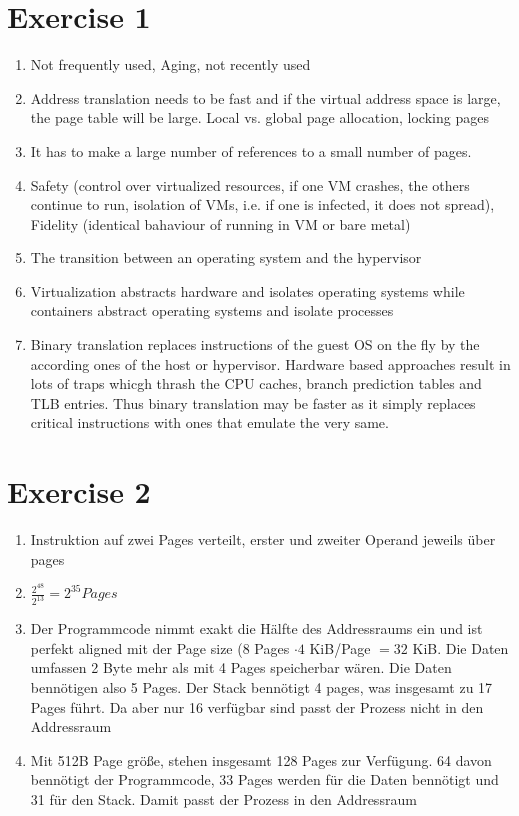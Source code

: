 \documentclass[a4paper,10pt]{article}
\begin{document}
\section*{Exercise 1}
    \begin{enumerate}
        \item Not frequently used, Aging, not recently used
        \item Address translation needs to be fast and if the virtual address space is large, the page table will be large. Local vs. global page allocation, locking pages
        \item It has to make a large number of references to a small number of pages.
        \item Safety (control over virtualized resources, if one VM crashes, the others continue to run, isolation of VMs, i.e. if one is infected, it does not spread), Fidelity (identical bahaviour of running in VM or bare metal)
        \item The transition between an operating system and the hypervisor
        \item Virtualization abstracts hardware and isolates operating systems while containers abstract operating systems and isolate processes
        \item Binary translation replaces instructions of the guest OS on the fly by the according ones of the host or hypervisor. Hardware based approaches result in lots of traps whicgh thrash the CPU caches, branch prediction tables and TLB entries. Thus binary translation may be faster as it simply replaces critical instructions with ones that emulate the very same.
    \end{enumerate}

\section*{Exercise 2}
    \begin{enumerate}
        \item Instruktion auf zwei Pages verteilt, erster und zweiter Operand jeweils über pages
        \item $\frac{2^{48}}{2^{13}} = 2^{35} Pages$
        \item Der Programmcode nimmt exakt die Hälfte des Addressraums ein und ist perfekt aligned mit der Page size ($8$ Pages $\cdot 4$ KiB/Page $= 32$ KiB. Die Daten umfassen 2 Byte mehr als mit 4 Pages speicherbar wären. Die Daten bennötigen also 5 Pages. Der Stack bennötigt 4 pages, was insgesamt zu 17 Pages führt. Da aber nur 16 verfügbar sind passt der Prozess nicht in den Addressraum
        \item Mit 512B Page größe, stehen insgesamt 128 Pages zur Verfügung. 64 davon bennötigt der Programmcode, 33 Pages werden für die Daten bennötigt und 31 für den Stack. Damit passt der Prozess in den Addressraum
    \end{enumerate}
\end{document}
